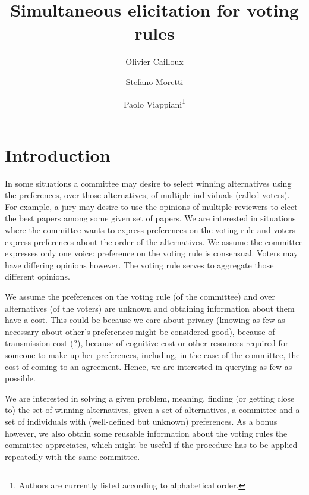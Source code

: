 \documentclass[version=last, pagesize, twoside=off, bibliography=totoc, DIV=calc, fontsize=14pt, a4paper, french, english]{scrartcl}
\begin{document}
\title{Simultaneous elicitation for voting rules}
\author{Olivier Cailloux}
\author{Stefano Moretti}
\author{Paolo Viappiani\footnote{Authors are currently listed according to alphabetical order.}}
\makeatletter
\makeatother
\maketitle

\section{Introduction}
In some situations a committee may desire to select winning alternatives using the preferences, over those alternatives, of multiple individuals (called voters). For example, a jury may desire to use the opinions of multiple reviewers to elect the best papers among some given set of papers. We are interested in situations where the committee wants to express preferences on the voting rule and voters express preferences about the order of the alternatives. We assume the committee expresses only one voice: preference on the voting rule is consensual. Voters may have differing opinions however. The voting rule serves to aggregate those different opinions.

We assume the preferences on the voting rule (of the committee) and over alternatives (of the voters) are unknown and obtaining information about them have a cost. This could be because we care about privacy (knowing as few as necessary about other’s preferences might be considered good), because of transmission cost (?), because of cognitive cost or other resources required for someone to make up her preferences, including, in the case of the committee, the cost of coming to an agreement. Hence, we are interested in querying as few as possible.

We are interested in solving a given problem, meaning, finding (or getting close to) the set of winning alternatives, given a set of alternatives, a committee and a set of individuals with (well-defined but unknown) preferences. As a bonus however, we also obtain some reusable information about the voting rules the committee appreciates, which might be useful if the procedure has to be applied repeatedly with the same committee.
\end{document}
